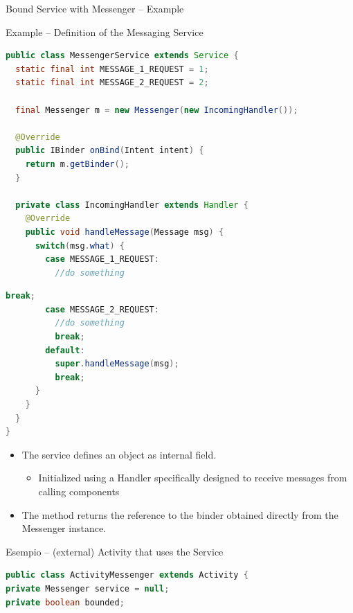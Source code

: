 \documentclass{beamer}
\begin{document}
  \begin{frame}{Bound Service with Messenger -- Example}
    \begin{exampleblock}{Example -- Definition of the Messaging Service}
      \begin{lstlisting}[language=Java]
public class MessengerService extends Service {
  static final int MESSAGE_1_REQUEST = 1;
  static final int MESSAGE_2_REQUEST = 2;
  
  final Messenger m = new Messenger(new IncomingHandler());
  
  @Override
  public IBinder onBind(Intent intent) {
    return m.getBinder();
  }

  private class IncomingHandler extends Handler {
    @Override
    public void handleMessage(Message msg) {
      switch(msg.what) {
        case MESSAGE_1_REQUEST:
          //do something
      \end{lstlisting}
    \end{exampleblock}  
    \begin{exampleblock}{\vspace{-10pt}}
      \begin{lstlisting}[language=Java]
          break;
        case MESSAGE_2_REQUEST:
          //do something
          break;
        default:
          super.handleMessage(msg);
          break;
      }
    }
  }
}
      \end{lstlisting}
    \end{exampleblock}

    \begin{itemize}
      \item The service defines an  object as internal
      field.
      \begin{itemize}
        \item Initialized using a Handler specifically designed to receive
        messages from calling components
      \end{itemize}
      \item The  method returns the reference to the binder
      obtained directly from the Messenger instance.
    \end{itemize}

    \begin{exampleblock}{Esempio -- (external) Activity that uses the Service}
      \begin{lstlisting}[language=Java]
public class ActivityMessenger extends Activity {
private Messenger service = null;
private boolean bounded;


\end{lstlisting}
\end{exampleblock}
\end{frame}
\end{document}
